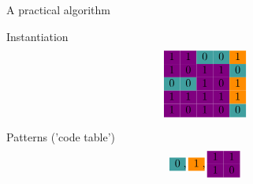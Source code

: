 \documentclass[11pt]{beamer}
\begin{document}
\begin{frame}{A practical algorithm}

\newcommand{\ca}{\cellcolor{cyan!45!yellow}}
\newcommand{\cb}{\cellcolor{red!75!blue}}
\newcommand{\cc}{\cellcolor{violet}}
\newcommand{\cd}{\cellcolor{teal!75}}
\newcommand{\ce}{\cellcolor{red!45!yellow}}

Instantiation
$$
\begin{matrix}
\cc 1 & \cc 1 & \cd 0 & \cd 0 & \ce 1  \\
\cc 1 & \cc 0 & \cc 1 & \cc 1 & \cd 0  \\
\cd 0 & \cd 0 & \cc 1 & \cc 0 & \ce 1  \\
\cc 1 & \cc 1 & \cc 1 & \cc 1 & \ce 1  \\
\cc 1 & \cc 0 & \cc 1 & \cc 0 & \cd 0  \\
\end{matrix}
$$

\small
Patterns ('code table')
$$
\begin{matrix}
\cd 0  \\
\end{matrix} \;,\enspace
\begin{matrix}
\ce 1 \\
\end{matrix} \;,\enspace
\begin{matrix}
\cc 1 & \cc 1 \\
\cc 1 & \cc 0 \\
\end{matrix}
$$ 


\end{frame}

\end{document}
